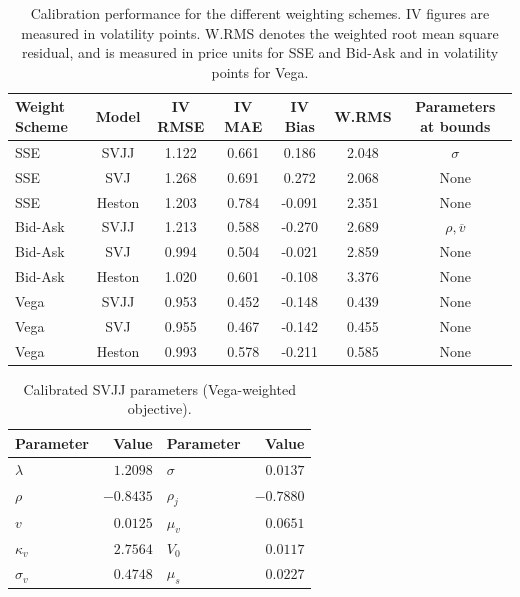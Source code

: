\begin{table}[H]
  \centering
  \begin{tabular}{lcccccc}
    \toprule
    Weight Scheme & Model & IV RMSE &IV MAE &IV Bias& W.RMS & Parameters at bounds\\
    \midrule
    SSE & SVJJ & 1.122 &0.661 & 0.186& 2.048 & $\sigma$ \\
    SSE & SVJ & 1.268 & 0.691& 0.272& 2.068 & None \\
    SSE & Heston & 1.203 &0.784&-0.091& 2.351 & None \\
    \midrule
    Bid-Ask& SVJJ & 1.213 & 0.588&-0.270&2.689 & $\rho, \overline{v}$ \\
    Bid-Ask& SVJ & 0.994 &0.504&-0.021& 2.859 & None \\
    Bid-Ask& Heston & 1.020 &0.601&-0.108& 3.376 & None \\
    \midrule
    Vega & SVJJ & 0.953 &0.452&-0.148& 0.439 & None \\
    Vega & SVJ & 0.955 &0.467&-0.142& 0.455 & None \\
    Vega & Heston & 0.993 &0.578&-0.211& 0.585& None \\
    \bottomrule
  \end{tabular}
  \caption{Calibration performance for the different weighting schemes.
    IV figures are measured in volatility points.
    W.RMS denotes the weighted root mean square residual, and is measured in
    price units for SSE and Bid-Ask and in volatility points
  for Vega.}
  \label{tab:calibration-weightsheme}
\end{table}


\begin{table}[ht]
\centering
\begin{tabular}{lrlr}
\toprule
Parameter & Value & Parameter & Value \\
\midrule
$\lambda$  & $1.2098$  & $\sigma$ & $0.0137$ \\
$\rho$     & $-0.8435$ & $\rho_j$ & $-0.7880$ \\
$v$        & $0.0125$  & $\mu_v$  & $0.0651$ \\
$\kappa_v$ & $2.7564$  & $V_0$    & $0.0117$ \\
$\sigma_v$ & $0.4748$  & $\mu_s$  & $0.0227$ \\
\bottomrule
\end{tabular}
\caption{Calibrated SVJJ parameters (Vega-weighted objective).}
\label{tab:svjj-params}
\end{table}


\global\def\lastproofcolor{formulabordercolor}
